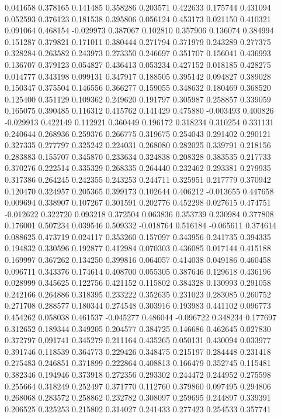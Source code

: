 0.041658
0.378165
0.141485
0.358286
0.203571
0.422633
0.175744
0.431094
0.052593
0.376123
0.181538
0.395806
0.056124
0.453173
0.021150
0.410321
0.091064
0.468154
-0.029973
0.387067
0.102810
0.357906
0.136074
0.384994
0.151287
0.379821
0.171011
0.380444
0.271794
0.371979
0.243289
0.277375
0.328284
0.263582
0.243973
0.273350
0.246697
0.351707
0.156041
0.436993
0.136707
0.379123
0.054827
0.436413
0.053234
0.427152
0.018185
0.428275
0.014777
0.343198
0.099131
0.347917
0.188505
0.395142
0.094827
0.389028
0.150347
0.375504
0.146556
0.366277
0.159055
0.348632
0.180469
0.368520
0.125400
0.351129
0.109362
0.249620
0.191797
0.305987
0.258857
0.339059
0.165075
0.390485
0.116312
0.415762
0.141429
0.475880
-0.003493
0.400826
-0.029913
0.422149
0.112921
0.360449
0.196172
0.318234
0.310254
0.331131
0.240644
0.268936
0.259376
0.266775
0.319675
0.254043
0.291402
0.290121
0.327335
0.277797
0.325242
0.224031
0.268080
0.282025
0.339791
0.218156
0.283883
0.155707
0.345870
0.233634
0.324838
0.208328
0.383535
0.217733
0.370276
0.222514
0.335329
0.268335
0.264440
0.232462
0.293381
0.279935
0.317386
0.264245
0.242355
0.243253
0.244711
0.325951
0.217779
0.370942
0.120470
0.324957
0.205365
0.399173
0.102644
0.406212
-0.013655
0.447658
0.009694
0.338907
0.107267
0.301591
0.202776
0.452298
0.027615
0.474751
-0.012622
0.322720
0.093218
0.372504
0.063836
0.353739
0.230984
0.377808
0.176001
0.507234
0.039546
0.509332
-0.018764
0.516184
-0.065611
0.374614
0.088625
0.473719
0.024117
0.353260
0.157097
0.343956
0.241735
0.394335
0.194832
0.330596
0.192877
0.412984
0.070303
0.436085
0.017144
0.415188
0.169997
0.367262
0.134250
0.399816
0.064057
0.414038
0.049186
0.460458
0.096711
0.343376
0.174614
0.408700
0.055305
0.387646
0.129618
0.436196
0.028999
0.345625
0.122756
0.421152
0.115802
0.384328
0.130993
0.291058
0.242166
0.264886
0.318395
0.233222
0.352635
0.231023
0.283085
0.260752
0.271708
0.288577
0.180344
0.274548
0.303916
0.193983
0.441102
0.096773
0.454262
0.058038
0.461537
-0.045277
0.486044
-0.096722
0.348234
0.177697
0.312652
0.189344
0.349205
0.204577
0.384725
0.146686
0.462645
0.027830
0.372797
0.091741
0.345279
0.211164
0.435265
0.050131
0.430094
0.033977
0.391746
0.118539
0.364773
0.229426
0.348475
0.215197
0.284448
0.231418
0.275483
0.246851
0.371899
0.222864
0.408813
0.166479
0.352745
0.115481
0.382346
0.194946
0.373918
0.272356
0.293302
0.244472
0.244952
0.275598
0.255664
0.318249
0.252497
0.371770
0.112760
0.379860
0.097495
0.294806
0.268068
0.283572
0.258862
0.232782
0.308097
0.259695
0.244897
0.339391
0.206525
0.325253
0.215802
0.314027
0.241433
0.277423
0.254533
0.357741
